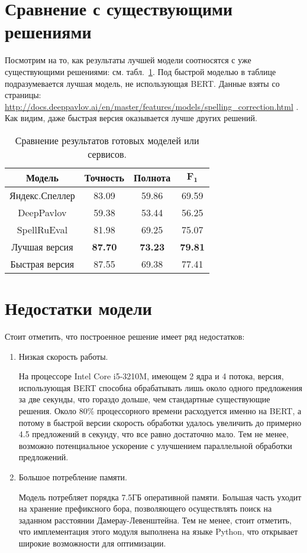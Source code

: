 \section{Сравнение с существующими решениями}

Посмотрим на то, как результаты лучшей модели соотносятся с уже существующими решениями: см. табл.~\ref{table:production_comparison}. Под быстрой моделью в таблице подразумевается лучшая модель, не использующая BERT. Данные взяты со страницы: \url{http://docs.deeppavlov.ai/en/master/features/models/spelling_correction.html} \cite{DeepPavlovTable}.  Как видим, даже быстрая версия оказывается лучше других решений.

\begin{table}[h]
	\begin{center}
		\caption{Сравнение результатов готовых моделей или сервисов.}
		\label{table:production_comparison}
		\begin{tabular}{|c|c|c|c|}
			\hline
			\textbf{Модель} & \textbf{Точность} & \textbf{Полнота} & $\boldsymbol{F_1}$  \\
			\hline
			Яндекс.Спеллер & 83.09  & 59.86 & 69.59 \\
			DeepPavlov & 59.38  & 53.44 & 56.25 \\
			SpellRuEval & 81.98  & 69.25 & 75.07 \\
			Лучшая версия & \textbf{87.70}  & \textbf{73.23} & \textbf{79.81} \\
			Быстрая версия & 87.55  & 69.38 & 77.41 \\
			\hline
		\end{tabular}
	\end{center}
\end{table}

\section{Недостатки модели}

Стоит отметить, что построенное решение имеет ряд недостатков:
\begin{enumerate}
	\item Низкая скорость работы. 
	
	На процессоре Intel Core i5-3210M, имеющем 2 ядра и 4 потока, версия, использующая BERT способна обрабатывать лишь около одного предложения за две секунды, что гораздо дольше, чем стандартные существующие решения. Около 80\% процессорного времени расходуется именно на BERT, а потому в быстрой версии скорость обработки удалось увеличить до примерно 4.5 предложений в секунду, что все равно достаточно мало. Тем не менее, возможно потенциальное ускорение с улучшением параллельной обработки предложений.
	
	\item Большое потребление памяти. 
	
	Модель потребляет порядка 7.5ГБ оперативной памяти. Большая часть уходит на хранение префиксного бора, позволяющего осуществлять поиск на заданном расстоянии Дамерау-Левенштейна. Тем не менее, стоит отметить, что имплементация этого модуля выполнена на языке Python, что открывает широкие возможности для оптимизации.
\end{enumerate}
